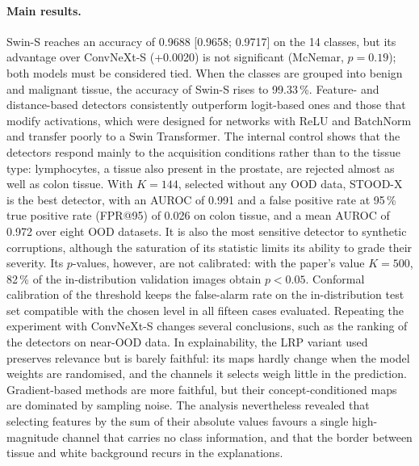 \paragraph{Main results.} Swin-S reaches an accuracy of 0.9688 [0.9658; 0.9717] on the 14 classes, but its advantage over ConvNeXt-S (+0.0020) is not significant (McNemar, $p = 0.19$); both models must be considered tied. When the classes are grouped into benign and malignant tissue, the accuracy of Swin-S rises to 99.33\,\%. Feature- and distance-based detectors consistently outperform logit-based ones and those that modify activations, which were designed for networks with ReLU and BatchNorm and transfer poorly to a Swin Transformer. The internal control shows that the detectors respond mainly to the acquisition conditions rather than to the tissue type: lymphocytes, a tissue also present in the prostate, are rejected almost as well as colon tissue. With $K = 144$, selected without any OOD data, STOOD-X is the best detector, with an AUROC of 0.991 and a false positive rate at 95\,\% true positive rate (FPR@95) of 0.026 on colon tissue, and a mean AUROC of 0.972 over eight OOD datasets. It is also the most sensitive detector to synthetic corruptions, although the saturation of its statistic limits its ability to grade their severity. Its $p$-values, however, are not calibrated: with the paper's value $K = 500$, 82\,\% of the in-distribution validation images obtain $p < 0.05$. Conformal calibration of the threshold keeps the false-alarm rate on the in-distribution test set compatible with the chosen level in all fifteen cases evaluated. Repeating the experiment with ConvNeXt-S changes several conclusions, such as the ranking of the detectors on near-OOD data. In explainability, the LRP variant used preserves relevance but is barely faithful: its maps hardly change when the model weights are randomised, and the channels it selects weigh little in the prediction. Gradient-based methods are more faithful, but their concept-conditioned maps are dominated by sampling noise. The analysis nevertheless revealed that selecting features by the sum of their absolute values favours a single high-magnitude channel that carries no class information, and that the border between tissue and white background recurs in the explanations. 

